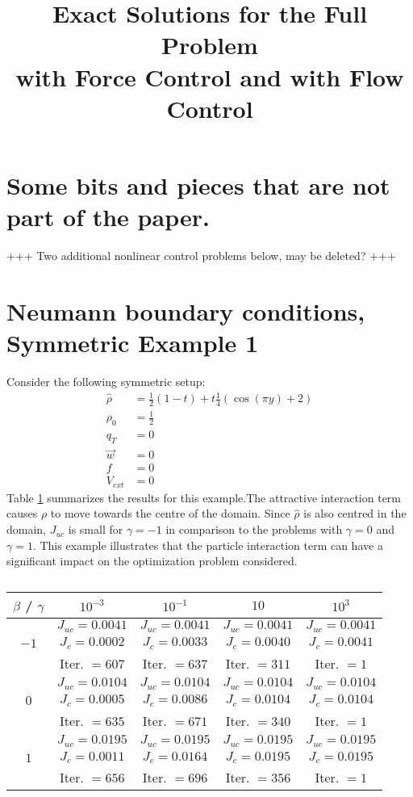 \documentclass[11pt, a4paper]{article}
\title{Exact Solutions for the Full Problem \\with Force Control and with Flow Control}
\date{}
\theoremstyle{definition}
\begin{document}
	\section{Some bits and pieces that are not part of the paper.}
	
	
	+++ Two additional nonlinear control problems below, may be deleted? +++
	\section{Neumann boundary conditions, Symmetric Example 1}
	Consider the following symmetric setup:
	\begin{align*}
	\widehat \rho &= \frac{1}{2}(1-t) + t\frac{1}{4}(\cos(\pi y)+2)\\
	\rho_{0} &= \frac{1}{2}\\
	q_{T} &= 0\\
	\vec{w} &= 0\\
	f &=0\\
	V_{ext} &=0
	\end{align*}
	Table \ref{TabNFlowAddEx1} summarizes the results for this example.The attractive interaction term causes $\rho$ to move towards the centre of the domain. Since $\widehat \rho$ is also centred in the domain, $J_{uc}$ is small for $\gamma =-1$ in comparison to the problems with $\gamma =0$ and $\gamma =1$. This example illustrates that the particle interaction term can have a significant impact on the optimization problem considered. 
	
	\begin{table}
		\begin{tabular}{ ||c|| c | c |c | c ||}
			\hline
			$\beta$ / $\gamma$ & $10^{-3}$  & $10^{-1}$  & $10$ & $10^3$ \\ 
			\hline 
			& $J_{uc} = 0.0041$ & $J_{uc} = 0.0041$  & $J_{uc} = 0.0041$ & $J_{uc} = 0.0041$\\ 
			$-1$ & $J_c = 0.0002$ & $J_c = 0.0033$ & $J_c = 0.0040$ & $J_c = 0.0041$\\ 
			& Iter. $= 607$ & Iter. $= 637$  & Iter. $= 311$ & Iter. $= 1$\\ 
			\hline
			& $J_{uc} = 0.0104$ & $J_{uc} = 0.0104$  & $J_{uc} = 0.0104$& $J_{uc} = 0.0104$\\
			$0$  & $J_c = 0.0005$ & $J_c = 0.0086$  & $J_c = 0.0104$ & $J_c = 0.0104$\\ 
			& Iter. $= 635$ & Iter. $= 671$  & Iter. $= 340$ & Iter. $= 1$\\ 
			\hline
			& $J_{uc} = 0.0195$ & $J_{uc} = 0.0195$  & $J_{uc} = 0.0195$ & $J_{uc} = 0.0195$\\
			$1$  & $J_c = 0.0011$ & $J_c = 0.0164$  & $J_c = 0.0195$ & $J_c = 0.0195$\\ 
			& Iter. $= 656$ & Iter. $= 696$  & Iter. $= 356$ & Iter. $= 1$\\ 
			\hline 
		\end{tabular}
		\caption{}
		\label{TabNFlowAddEx1}
	\end{table}
	
\end{document}
